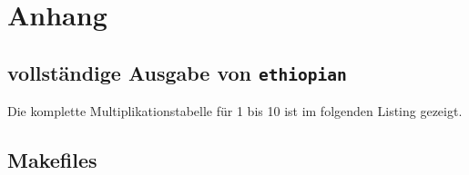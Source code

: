 



\chapter{Anhang}


\section{vollständige Ausgabe von \texttt{ethiopian}}

Die komplette Multiplikationstabelle für 1 bis 10 ist im folgenden Listing gezeigt.


\section{Makefiles}





